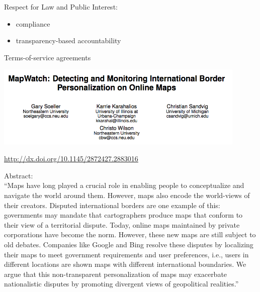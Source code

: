 \documentclass{beamer}
\def\vf{\vfill}
\begin{document}
\begin{frame}

Respect for Law and Public Interest:\\
\begin{itemize}
\item compliance
\item transparency-based accountability
\end{itemize}

\end{frame}
\begin{frame}

Terms-of-service agreements

\end{frame}
\begin{frame}

\begin{center}
\includegraphics[width=0.9\textwidth]{figures/soeller_mapwatch_2016_title.png}
\end{center}

\vf
\url{http://dx.doi.org/10.1145/2872427.2883016}
\end{frame}
\begin{frame}

Abstract:\\
``Maps have long played a crucial role in enabling people to conceptualize and navigate the world around them. However, maps also encode the world-views of their creators. Disputed international borders are one example of this: governments may mandate that cartographers produce maps that conform to their view of a territorial dispute. Today, online maps maintained by private corporations have become the norm. However, these new maps are still subject to old debates. Companies like Google and Bing resolve these disputes by localizing their maps to meet government requirements and user preferences, i.e., users in different locations are shown maps with different international boundaries. We argue that this non-transparent personalization of maps may exacerbate nationalistic disputes by promoting divergent views of geopolitical realities.''

\end{frame}
\end{document}
